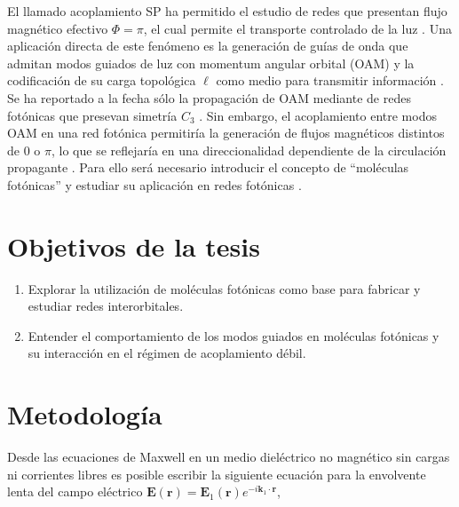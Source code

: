 \documentclass{article}
\begin{document}
	El llamado acoplamiento SP ha permitido el estudio de redes que presentan flujo magnético efectivo $\Phi = \pi$, el cual permite el transporte controlado de la luz \cite{OAMCaging, ABCaging}. Una aplicación directa de este fenómeno es la generación de guías de onda que admitan modos guiados de luz con momentum angular orbital (OAM) y la codificación de su carga topológica $\ell$ como medio para transmitir información \cite{oamapp, oamfree}. Se ha reportado a la fecha sólo la propagación de OAM mediante de redes fotónicas que presevan simetría $C_3$ \cite{OAMWG, vortex}. Sin embargo, el acoplamiento entre modos OAM en una red fotónica permitiría la generación de flujos magnéticos distintos de $0$ o $\pi$, lo que se reflejaría en una direccionalidad dependiente de la circulación propagante \cite{vortextrim, topoOAM}. Para ello será necesario introducir el concepto de ``moléculas fotónicas'' \cite{molecules} y estudiar su aplicación en redes fotónicas \cite{SPSSH}.
\section{Objetivos de la tesis}
\begin{enumerate}
	\item Explorar la utilización de moléculas fotónicas como base para fabricar y estudiar redes interorbitales.
	\item Entender el comportamiento de los modos guiados en moléculas fotónicas y su interacción en el régimen de acoplamiento débil.
\end{enumerate}
\section{Metodología}

Desde las ecuaciones de Maxwell en un medio dieléctrico no magnético sin cargas ni corrientes libres es posible escribir la siguiente ecuación para la envolvente lenta del campo eléctrico $\textbf{E}(\textbf{r}) = \textbf{E}_1(\textbf{r}) e^{-i \textbf{k}_1 \cdot \textbf{r}}$,
\end{document}
